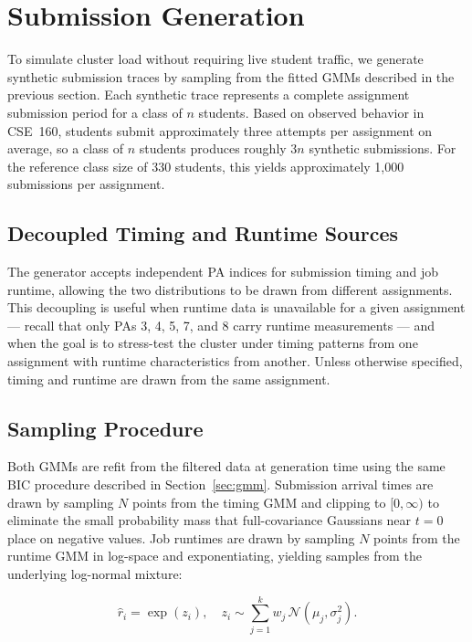 \documentclass[acmlarge]{acmart}
\begin{document}
\section{Submission Generation}
To simulate cluster load without requiring live student traffic, we generate synthetic submission traces by sampling from the fitted GMMs described in the previous section. Each synthetic trace represents a complete assignment submission period for a class of $n$ students. Based on observed behavior in CSE~160, students submit approximately three attempts per assignment on average, so a class of $n$ students produces roughly $3n$ synthetic submissions. For the reference class size of 330 students, this yields approximately 1,000 submissions per assignment.

\subsection{Decoupled Timing and Runtime Sources}
The generator accepts independent PA indices for submission timing and job runtime, allowing the two distributions to be drawn from different assignments. This decoupling is useful when runtime data is unavailable for a given assignment --- recall that only PAs 3, 4, 5, 7, and 8 carry runtime measurements --- and when the goal is to stress-test the cluster under timing patterns from one assignment with runtime characteristics from another. Unless otherwise specified, timing and runtime are drawn from the same assignment.

\subsection{Sampling Procedure}
 
Both GMMs are refit from the filtered data at generation time using the same BIC procedure described in Section~\ref{sec:gmm}. Submission arrival times are drawn by sampling $N$ points from the timing GMM and clipping to $[0, \infty)$ to eliminate the small probability mass that full-covariance Gaussians near $t = 0$ place on negative values. Job runtimes are drawn by sampling $N$ points from the runtime GMM in log-space and exponentiating, yielding samples from the underlying log-normal mixture:
 
\begin{equation}
    \hat{r}_i = \exp\!\left( z_i \right), \quad z_i \sim \sum_{j=1}^{k} w_j \,\mathcal{N}(\mu_j, \sigma_j^2).
    \label{eq:runtime_sample}
\end{equation}
 
\end{document}

